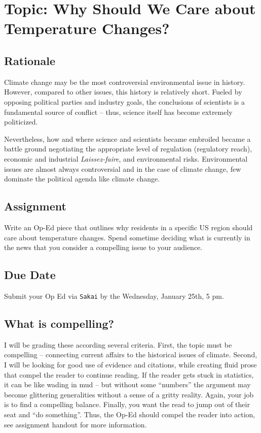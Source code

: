\section{Topic: Why Should We Care about Temperature Changes?}

\subsection{Rationale}

Climate change may be the most controversial environmental issue in history. However, compared to other issues, this history is relatively short. Fueled by opposing political parties and industry goals, the conclusions of scientists is a fundamental source of conflict -- thus, science itself has become extremely politicized. 

Nevertheless, how and where science and scientists became embroiled became a battle ground negotiating the appropriate level of regulation (regulatory reach), economic and industrial \textit{Laissez-faire}, and environmental risks. Environmental issues are almost always controversial and in the case of climate change, few dominate the political agenda like climate change. 

\subsection{Assignment}

Write an Op-Ed piece that outlines why residents in a specific US region should care about temperature changes. Spend sometime deciding what is currently in the news that you consider a compelling issue to your audience.

\subsection{Due Date}

Submit your Op Ed via \texttt{Sakai} by the Wednesday, January 25th, 5 pm.

\subsection{What is compelling?}

I will be grading these according several criteria. First, the topic must be compelling -- connecting current affairs to the historical issues of climate. Second, I will be looking for good use of evidence and citations, while creating fluid prose that compel the reader to continue reading. If the reader gets stuck in statistics, it can be like wading in mud -- but without some ``numbers'' the argument may become glittering generalities without a sense of a gritty reality. Again, your job is to find a compelling balance. Finally, you want the read to jump out of their seat and ``do something''. Thus, the Op-Ed should compel the reader into action, see assignment handout for more information.






